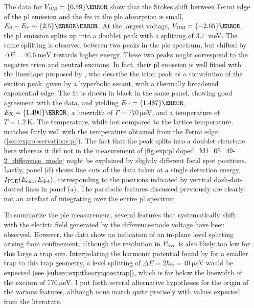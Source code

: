 The data for $\VDM = \qty{0.59}{\volt}$ show that the Stokes shift between Fermi edge of the \gls{pl} emission and the \gls{fes} in the \gls{ple} absorption is small, $E_{\mr{S}} - E_{\mr{F}}\sim\qty{2.5}{\milli\electronvolt}$.
At the largest voltage, $\VDM = \qty{-2.65}{\volt}$, the \gls{pl} emission splits up into a doublet peak with a splitting of \qty{3.7}{\milli\electronvolt}.
The same splitting is observed between two peaks in the \gls{ple} spectrum, but shifted by $\Delta E = \qty{40.6}{\milli\electronvolt}$ towards higher energy.
These two peaks might correspond to the negative trion and neutral excitons.
In fact, their \gls{pl} emission is well fitted with the lineshape proposed by \citet{Esser2001}, who describe the trion peak as a convolution of the exciton peak, given by a hyperbolic secant, with a thermally broadened exponential edge.
The fit is drawn in black in the same panel, showing good agreement with the data, and yielding $E_{\mr{T}} = \qty{1.487}{\electronvolt}$, $E_{\mr{X}} = \qty{1.490}{\electronvolt}$, a linewidth of $\Gamma = \qty{770}{\micro\electronvolt}$, and a temperature of $T = \qty{1.2}{\kelvin}$.
The temperature, while hot compared to the lattice temperature, matches fairly well with the temperature obtained from the Fermi edge (\cref{sec:exp:observations:pl}).
The fact that the peak splits into a doublet structure here whereas it did not in the measurement of \cref{fig:exp:pl:doped_M1_05_49-2_difference_mode} might be explained by slightly different focal spot positions.
Lastly, panel (d) shows line cuts of the data taken at a single detection energy, $I_{\mathrm{PLE}}(E_{\mathrm{exc}}; E_{\mathrm{det}})$, corresponding to the positions indicated by vertical dash-dot-dotted lines in panel (a).
The parabolic features discussed previously are clearly not an artefact of integrating over the entire \gls{pl} spectrum.

To summarize the \gls{ple} measurement, several features that systematically shift with the electric field generated by the difference-mode voltage \VDM have been observed.
However, the data show no indication of an in-plane level splitting arising from confinement, although the resolution in $E_{\mathrm{exc}}$ is also likely too low for this large a trap size.
Interpolating the harmonic potential found by \citet{Descamps2021} for a smaller trap to this trap geometry,
a level splitting of $\Delta E = 2\hbar\omega = \qty{40}{\micro\electronvolt}$ would be expected (see \cref{subsec:exp:theory:qcse:trap}), which is far below the linewidth of the exciton of $\qty{770}{\micro\electronvolt}$.
I put forth several alternative hypotheses for the origin of the various features, although none match quite precisely with values expected from the literature.

